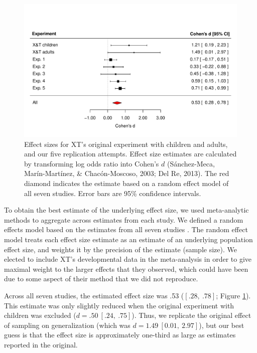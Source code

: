 \documentclass[man]{apa2}
\begin{document}
\begin{figure}[t]
  \centering
  \includegraphics[width=6in]{figures/FIG_3.pdf} 
  \caption{\label{fig:effect_sizes} Effect sizes for XT's original experiment with children and adults, and our five replication attempts. Effect size estimates are calculated  by transforming log odds ratio into Cohen's $d$ (S\'{a}nchez-Meca, Mar\'{i}n-Mart\'{i}nez, \& Chac\'{o}n-Moscoso, 2003; Del Re, 2013). The red diamond indicates the estimate based on a random effect model of all seven studies. Error bars are 95\% confidence intervals.} 
\end{figure}

To obtain the best estimate of the underlying effect size, we used meta-analytic methods to aggregate across estimates from each study. We defined a random effects model based on the estimates from all seven studies \cite{Viechtbauer2010}. The random effect model treats each effect size estimate as an estimate of an underlying population effect size, and weights it by the precision of the estimate (sample size). We elected to include XT's developmental data in the meta-analysis in order to give maximal weight to the larger effects that they observed, which could have been due to some aspect of their method that we did not reproduce.

Across all seven studies, the estimated effect size was .53 ($[.28,\ .78]$; Figure \ref{fig:effect_sizes}). This estimate was only slightly reduced when the original experiment with children was excluded  ($d = .50\ [.24,\ .75]$). Thus, we replicate the original effect of sampling on generalization (which was $d = 1.49\ [0.01,\ 2.97]$), but our best guess is that the effect size is approximately one-third as large as estimates reported in the original.
\end{document}
